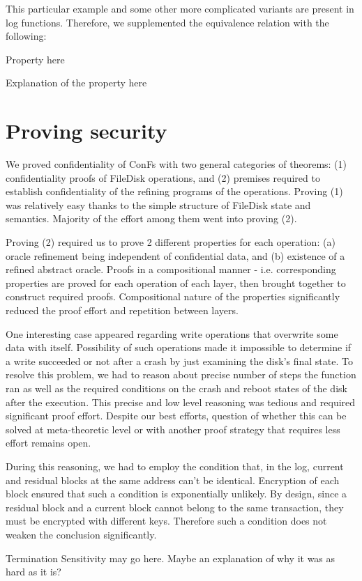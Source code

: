 This particular example and some other more complicated variants are present in log functions. Therefore, we supplemented the equivalence relation with the following:

{\color{red} Property here}

{\color{red} Explanation of the property here}


\section{Proving security}
We proved confidentiality of ConFs with two general categories of theorems: (1) confidentiality proofs of FileDisk operations, and (2) premises required to establish confidentiality of the refining programs of the operations. Proving (1) was relatively easy thanks to the simple structure of FileDisk state and semantics. Majority of the effort among them went into proving (2).

Proving (2) required us to prove 2 different properties for each operation: (a) oracle refinement being independent of confidential data, and (b) existence of a refined abstract oracle. Proofs in a compositional manner - i.e. corresponding properties are proved for each operation of each layer, then brought together to construct required proofs. Compositional nature of the properties significantly reduced the proof effort and repetition between layers.

One interesting case appeared regarding write operations that overwrite some data with itself. Possibility of such operations made it impossible to determine if a write succeeded or not after a crash by just examining the disk's final state. To resolve this problem, we had to reason about precise number of steps the function ran as well as the required conditions on the crash and reboot states of the disk after the execution.  This precise and low level reasoning was tedious and required significant proof effort. Despite our best efforts, question of whether this can be solved at meta-theoretic level or with another proof strategy that requires less effort remains open.

During this reasoning, we had to employ the condition that, in the log, current and residual blocks at the same address can't be identical. Encryption of each block ensured that such a condition is exponentially unlikely. By design, since a residual block and a current block cannot belong to the same transaction, they must be encrypted with different keys. Therefore such a condition does not weaken the conclusion significantly.


{\color{red} Termination Sensitivity may go here. Maybe an explanation of why it was as hard as it is?}
